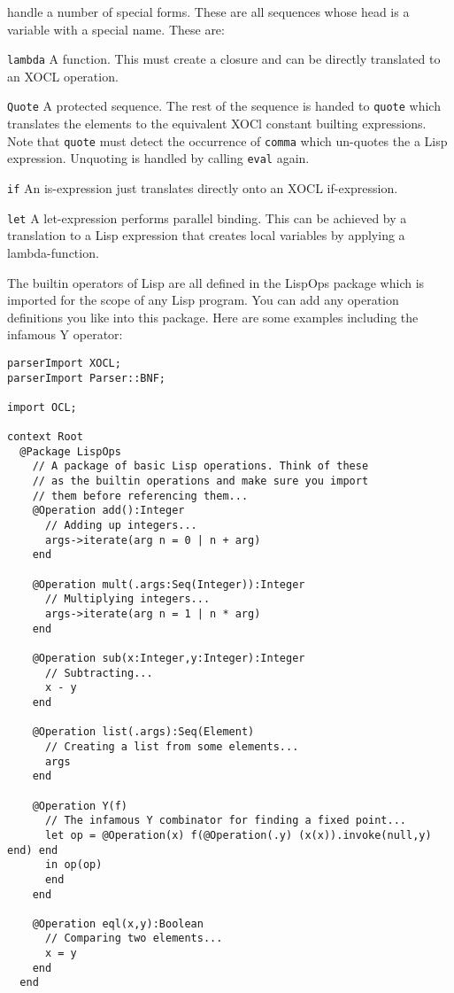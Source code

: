 handle a number of special forms. These are all sequences whose head is
a variable with a special name. These are:
\begin{description}
\item{\tt lambda} A function. This must create a closure and can be
directly translated to an XOCL operation.
\item{\tt Quote} A protected sequence. The rest of the sequence is
handed to {\tt quote} which translates the elements to the equivalent
XOCl constant builting expressions. Note that {\tt quote} must detect
the occurrence of {\tt comma} which un-quotes the a Lisp expression.
Unquoting is handled by calling {\tt eval} again.
\item{\tt if} An is-expression just translates directly onto an XOCL
if-expression.
\item{\tt let} A let-expression performs parallel binding. This can be
achieved by a translation to a Lisp expression that creates local
variables by applying a lambda-function.
\end{description}
The builtin operators of Lisp are all defined in the LispOps package
which is imported for the scope of any Lisp program. You can add any
operation definitions you like into this package. Here are some
examples including the infamous Y operator:
\begin{lstlisting}
parserImport XOCL;
parserImport Parser::BNF;
 
import OCL;
    
context Root 
  @Package LispOps  
    // A package of basic Lisp operations. Think of these
    // as the builtin operations and make sure you import
    // them before referencing them...  
    @Operation add():Integer    
      // Adding up integers...      
      args->iterate(arg n = 0 | n + arg)
    end
    
    @Operation mult(.args:Seq(Integer)):Integer    
      // Multiplying integers...      
      args->iterate(arg n = 1 | n * arg)
    end
    
    @Operation sub(x:Integer,y:Integer):Integer    
      // Subtracting...      
      x - y
    end
    
    @Operation list(.args):Seq(Element)    
      // Creating a list from some elements...     
      args
    end
    
    @Operation Y(f)    
      // The infamous Y combinator for finding a fixed point...      
      let op = @Operation(x) f(@Operation(.y) (x(x)).invoke(null,y) end) end
      in op(op)
      end
    end
    
    @Operation eql(x,y):Boolean   
      // Comparing two elements...      
      x = y
    end    
  end
\end{lstlisting}